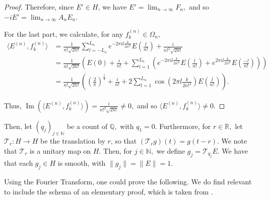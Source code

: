 \documentclass[10pt,a4paper]{amsart}
\def \LL{\langle}
\def \RR{\rangle}
\begin{document}
\begin{proof}
	Therefore, since $E'\in H$, we have $E'=\lim_{n\rightarrow\infty} F_n,$ and so $-iE'=\lim_{n\rightarrow\infty}A_n E_n.$
	
	For the last part, we calculate, for any $f_k^{(n)}\in\Omega_n,$
	\begin{align*}
		\LL  E^{(n)}, f_k^{(n)} \RR&=\frac{1}{n!\sqrt{2n!}}\sum_{l=-L_n}^{L_n}e^{-2\pi i l\frac{k}{2n!^2}}E\left(\frac{l}{n!}\right)+\frac{i}{n!^2\sqrt{2n!}}\\
		&=\frac{1}{n!\sqrt{2n!}}\left(E(0)+\frac{i}{n!}+\sum_{l=1}^{L_n}\left(e^{-2\pi i l\frac{k}{2n!^2}}E\left(\frac{l}{n!}\right)+e^{2\pi i l\frac{k}{2n!^2}}E\left(\frac{-l}{n!}\right)\right)\right)\\
		&=\frac{1}{n!\sqrt{2n!}}\left(\left(\frac{2}{\pi}\right)^{\frac{1}{4}}+\frac{i}{n!}+2\sum_{l=1}^{L_n}\cos\left(2\pi l\frac{k}{2n!^2}\right)E\left(\frac{l}{n!}\right)\right).
	\end{align*}
	
	Thus, $\operatorname{Im}(\LL E^{(n)},f_k^{(n)}\RR)=\frac{i}{n!^2\sqrt{2n!}}\neq 0,$ and so $\LL E^{(n)}, f_k^{(n)}\RR\neq 0.$
\end{proof}

Then, let $(q_j)_{j\in\mathbb{N}}$ be a count of $\mathbb{Q},$ with $q_1=0.$ Furthermore, for $r\in\mathbb{R},$ let $\mathcal{T}_r:H\rightarrow H$ be the translation by $r$, so that $(\mathcal{T}_r g)(t)=g(t-r).$ We note that $\mathcal{T}_r$ is a unitary map on $H$. Then, for $j\in\mathbb{N},$ we define $g_j=\mathcal{T}_{q_j} E$. We have that each $g_j\in H$ is smooth, with $\|g_j\|=\|E\|=1.$

Using the Fourier Transform, one could prove the following. We do find relevant to include the schema of an elementary proof, which is taken from \cite{nonez2024spectralequivalencesnonstandardsamplings}.
\end{document}
